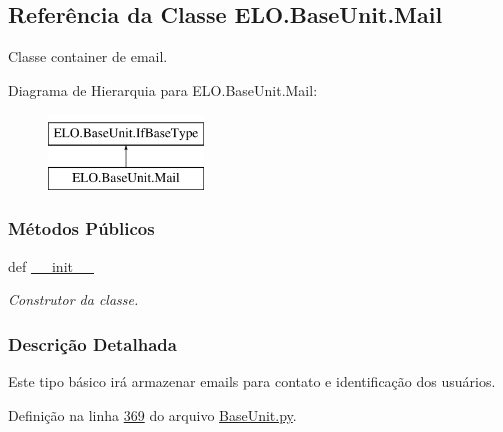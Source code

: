 \hypertarget{classELO_1_1BaseUnit_1_1Mail}{\subsection{Referência da Classe E\-L\-O.\-Base\-Unit.\-Mail}
\label{classELO_1_1BaseUnit_1_1Mail}
}


Classe container de email.  


Diagrama de Hierarquia para E\-L\-O.\-Base\-Unit.\-Mail\-:\begin{figure}[H]
\begin{center}
\leavevmode
\includegraphics[height=2.000000cm]{d5/db6/classELO_1_1BaseUnit_1_1Mail}
\end{center}
\end{figure}
\subsubsection*{Métodos Públicos}
\begin{DoxyCompactItemize}
\item 
def \hyperlink{classELO_1_1BaseUnit_1_1Mail_a7b9e31959dacc8c25ecae3e9bc0321aa}{\-\_\-\-\_\-init\-\_\-\-\_\-}
\begin{DoxyCompactList}\small\item\em Construtor da classe. \end{DoxyCompactList}\end{DoxyCompactItemize}


\subsubsection{Descrição Detalhada}
Este tipo básico irá armazenar emails para contato e identificação dos usuários. 

Definição na linha \hyperlink{BaseUnit_8py_source_l00369}{369} do arquivo \hyperlink{BaseUnit_8py_source}{Base\-Unit.\-py}.



